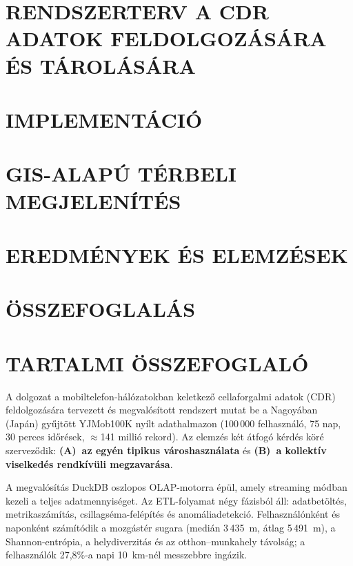 \clearpage
\section{RENDSZERTERV A CDR ADATOK FELDOLGOZÁSÁRA ÉS TÁROLÁSÁRA}


\clearpage
\section{IMPLEMENTÁCIÓ}


\clearpage
\section{GIS-ALAPÚ TÉRBELI MEGJELENÍTÉS}


\clearpage
\section{EREDMÉNYEK ÉS ELEMZÉSEK}


\clearpage
\section{ÖSSZEFOGLALÁS}



\clearpage
\section*{TARTALMI ÖSSZEFOGLALÓ}

A dolgozat a mobiltelefon-hálózatokban keletkező cellaforgalmi adatok (CDR) feldolgozására tervezett és megvalósított rendszert mutat be a Nagoyában (Japán) gyűjtött YJMob100K nyílt adathalmazon (100\,000 felhasználó, 75 nap, 30 perces időrések, $\approx$141 millió rekord). Az elemzés két átfogó kérdés köré szerveződik: \textbf{(A)~az egyén tipikus városhasználata} és \textbf{(B)~a kollektív viselkedés rendkívüli megzavarása}.

A megvalósítás DuckDB oszlopos OLAP-motorra épül, amely streaming módban kezeli a teljes adatmennyiséget. Az ETL-folyamat négy fázisból áll: adatbetöltés, metrikaszámítás, csillagséma-felépítés és anomáliadetekció. Felhasználónként és naponként számítódik a mozgástér sugara (medián 3\,435~m, átlag 5\,491~m), a Shannon-entrópia, a helydiverzitás és az otthon–munkahely távolság; a felhasználók 27,8\%-a napi 10~km-nél messzebbre ingázik.

